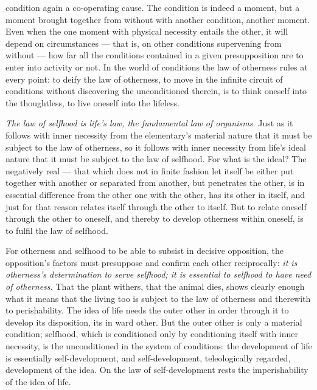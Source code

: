 \documentclass[12pt,a4paper]{book}
\begin{document}
condition again a co-operating cause. The condition is indeed a moment, but a
moment brought together from without with another condition, another moment. Even
when the one moment with physical necessity entails the other, it will depend on
circumstances --- that is, on other conditions supervening from without ---
how far all the conditions contained in a given presupposition are to enter into
activity or not. In the world of conditions the law of otherness rules at every
point: to deify the law of otherness, to move in the infinite circuit of
conditions without discovering the unconditioned therein, is to think oneself
into the thoughtless, to live oneself into the lifeless.

\emph{The law of selfhood is life's law, the fundamental law of organisms.} Just
as it follows with inner necessity from the elementary's material nature that it
must be subject to the law of otherness, so it follows with inner necessity from
life's ideal nature that it must be subject to the law of selfhood. For what is
the ideal? The negatively real --- that which does not in finite fashion let
itself be either put together with another or separated from another, but
penetrates the other, is in essential difference from the other one with the
other, has its other in itself, and just for that reason relates itself through
the other to itself. But to relate oneself through the other to oneself, and
thereby to develop otherness within oneself, is to fulfil the law of selfhood.

For otherness and selfhood to be able to subsist in decisive opposition, the
opposition's factors must presuppose and confirm each other reciprocally:
\emph{it is otherness's determination to serve selfhood; it is essential to
selfhood to have need of otherness.} That the plant withers, that the animal
dies, shows clearly enough what it means that the living too is subject to the
law of otherness and therewith to perishability. The idea of life needs the outer
other in order through it to develop its disposition, its in%
ward other. But the outer other is only a material condition; selfhood, which is
conditioned only by conditioning itself with inner necessity, is the unconditioned
in the system of conditions: the development of life is essentially
self-development, and self-development, teleologically regarded, development of
the idea. On the law of self-development rests the imperishability of the idea of
life.
\end{document}
